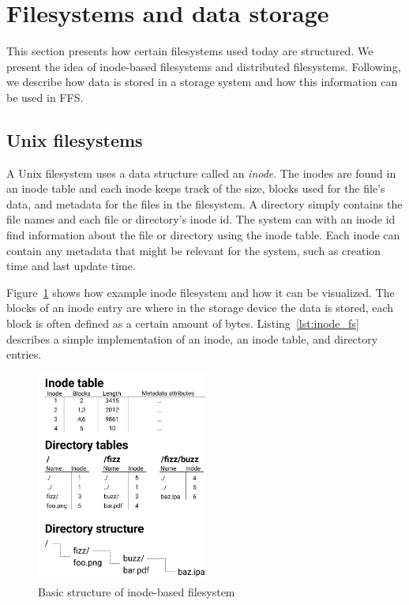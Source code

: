 \section{Filesystems and data storage}
This section presents how certain filesystems used today are structured. We present the idea of inode-based filesystems and distributed filesystems. Following, we describe how data is stored in a storage system and how this information can be used in FFS.

\subsection{Unix filesystems}
A Unix filesystem uses a data structure called an \textit{inode}. The inodes are found in an inode table and each inode keeps track of the size, blocks used for the file's data, and metadata for the files in the filesystem. A directory simply contains the file names and each file or directory's inode id. The system can with an inode id find information about the file or directory using the inode table. Each inode can contain any metadata that might be relevant for the system, such as creation time and last update time. 

Figure~\ref{fig:inode_diag} shows how example inode filesystem and how it can be visualized. The blocks of an inode entry are where in the storage device the data is stored, each block is often defined as a certain amount of bytes. Listing~\ref{lst:inode_fs} describes a simple implementation of an inode, an inode table, and directory entries. 


\begin{figure}[!ht]
	\begin{center}
	  \includegraphics[width=0.5\textwidth]{figures/inode_diagram.png}
	\end{center}
	\caption{Basic structure of inode-based filesystem}
	\label{fig:inode_diag}
\end{figure}

